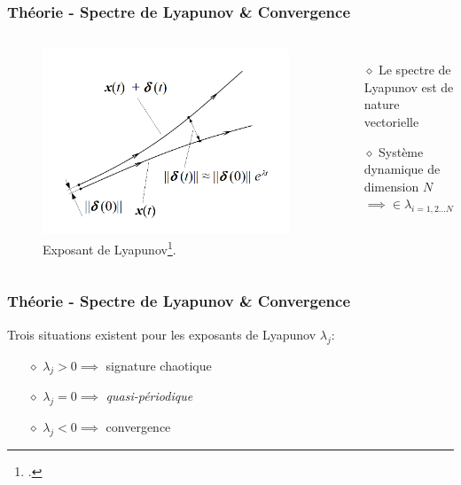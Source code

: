 \begin{frame}
    \frametitle{Théorie - Spectre de Lyapunov \& Convergence}
    \begin{columns}
        \centering
        \begin{figure}
            \begin{center}
                \includegraphics[scale=0.3]{figures/lyapunov_exponent.png}
            \end{center}
            \caption{Exposant de Lyapunov\footcite{LEswiki}.}
        \end{figure}
        \begin{itemize}
            \setlength\itemsep{1em}
            \item[$\diamond$] Le spectre de Lyapunov est de nature vectorielle
            \item[$\diamond$] Système dynamique de dimension $N$ $\implies\in\lambda_{i=1, 2\dots N}$ \\
        \end{itemize}
    \end{columns}
\end{frame}

\begin{frame}
    \frametitle{Théorie - Spectre de Lyapunov \& Convergence}
    Trois situations existent pour les exposants de Lyapunov $\lambda_j$:
    \vspace{0.5cm}
    \begin{itemize}
        \setlength\itemsep{1em}
        \item[$\diamond$] $\lambda_j > 0\implies$ signature chaotique
        \item[$\diamond$] $\lambda_j = 0\implies$ \textit{quasi-périodique}
        \item[$\diamond$] $\lambda_j < 0\implies$ convergence
    \end{itemize}
\end{frame}

